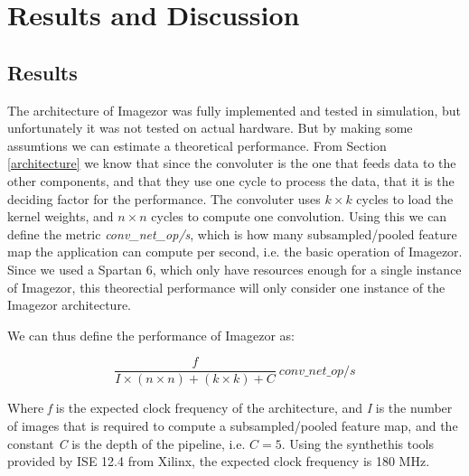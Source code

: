 \chapter{Results and Discussion} \label{chap_results}

\section{Results}

The architecture of Imagezor was fully implemented and tested in simulation, but unfortunately it was not tested on actual hardware. But by making some assumtions we can estimate a theoretical performance. From Section \ref{architecture} we know that since the convoluter is the one that feeds data to the other components, and that they use one cycle to process the data, that it is the deciding factor for the performance. The convoluter uses $ k \times k $ cycles to load the kernel weights, and $ n \times n $ cycles to compute one convolution.  Using this we can define the metric \textit{conv\_net\_op/s}, which is how many subsampled/pooled feature map the application can compute per second, i.e. the basic operation of Imagezor. Since we used a Spartan 6, which only have resources enough for a single instance of Imagezor, this theorectial performance will only consider one instance of the Imagezor architecture.  

We can thus define the performance of Imagezor as:

\begin{equation} \label{eq_theoretical_performance}
\frac{f}{I\times(n \times n) + (k \times k) + C} ~conv\_net\_op/s
\end{equation}

Where \textit{f} is the expected clock frequency of the architecture, and \textit{I} is the number of images that is required to compute a subsampled/pooled feature map, and the constant \textit{C} is the depth of the pipeline, i.e.  $ C = 5 $. Using the synthethis tools provided by ISE 12.4 from Xilinx, the expected clock frequency is 180 MHz.

